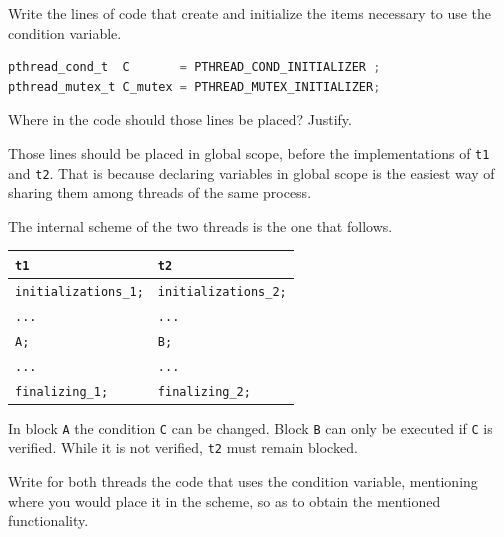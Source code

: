 \documentclass{sope}
\begin{document}
Write the lines of code that create and initialize the items necessary to use the condition variable.

\ansseparator

\begin{lstlisting}[language=C]
pthread_cond_t  C       = PTHREAD_COND_INITIALIZER ;
pthread_mutex_t C_mutex = PTHREAD_MUTEX_INITIALIZER;
\end{lstlisting}

Where in the code should those lines be placed? Justify.

\ansseparator

Those lines should be placed in global scope, before the implementations of \texttt{t1} and \texttt{t2}. That is because declaring variables in global scope is the easiest way of sharing them among threads of the same process.

The internal scheme of the two threads is the one that follows.

\begin{center}
    \begin{tabular}{l | l}
        \texttt{t1} & \texttt{t2} \\ \hline
        \texttt{initializations\_1;} & \texttt{initializations\_2;} \\
        \texttt{...} & \texttt{...} \\
        \texttt{A;} & \texttt{B;} \\
        \texttt{...} & \texttt{...} \\
        \texttt{finalizing\_1;} & \texttt{finalizing\_2;}
    \end{tabular}
\end{center}

In block \texttt{A} the condition \texttt{C} can be changed. Block \texttt{B} can only be executed if \texttt{C} is verified. While it is not verified, \texttt{t2} must remain blocked.

Write for both threads the code that uses the condition variable, mentioning where you would place it in the scheme, so as to obtain the mentioned functionality.

\ansseparator
\end{document}
